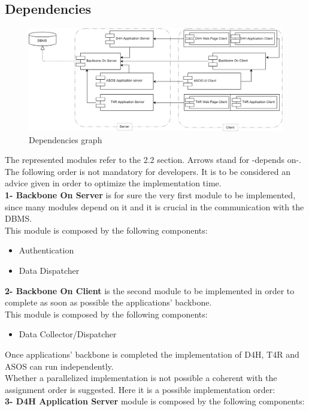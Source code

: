 \subsection{Dependencies}
\begin{figure}[H]
\caption{Dependencies graph}
\includegraphics[width = \textwidth]{sections/implementationIntegrationTestGraphs/DependenciesGraph.png}
\end{figure}
The represented modules refer to the 2.2 section. Arrows stand for -depends on-.\\
The following order is not mandatory for developers. It is to be considered an advice given in order to optimize the implementation time.\\
\textbf{1- Backbone On Server} is for sure the very first module to be implemented, since many modules depend on it and it is crucial in the communication with the DBMS.\\ This module is composed by the following components:
\begin{itemize}
\item Authentication
\item Data Dispatcher
\end{itemize}
 \textbf{2- Backbone On Client} is the second module to be implemented in order to complete as soon as possible the applications' backbone.\\ This module is composed by the following components:
\begin{itemize}
\item Data Collector/Dispatcher
\end{itemize}
Once applications' backbone is completed the implementation of D4H, T4R and ASOS can run independently.\\ Whether a parallelized implementation is not possible a coherent with the assignment order is suggested. Here it is a possible implementation order:\\
 \textbf{3- D4H Application Server} module is composed by the following components:
